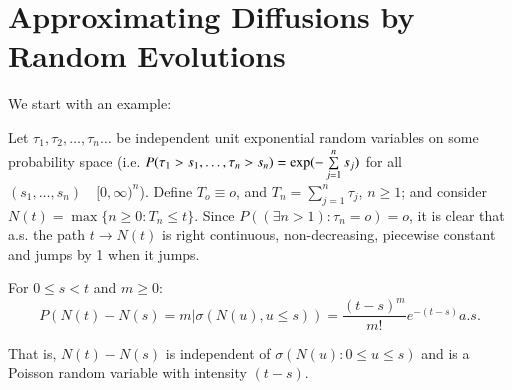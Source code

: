 \section{Approximating Diffusions by Random Evolutions}

We start with an example:


Let $\tau_1, \tau_2 , \ldots , \tau_n \ldots$ be independent unit
exponential random variables on some probability space (i.e. $P(\tau_1
> s_1, \ldots , \tau_n > s_n) = \exp\break (- \sum \limits^{n}_{j=1}s_j)$ for
all $(s_1, \ldots ,s_n) \quad [0, \infty)^n$). Define $T_o \equiv o$,
  and $T_n = \sum \limits^{n}_{j=1}\tau_j$, $n \geq 1$; and consider
  $N(t)= \max \{n \geq 0 : T_n \leq t\}$. Since $P((\exists n > 1):
  \tau_n = o)=o$, it is clear that a.s. the path $t \to N(t)$ is
  right continuous, non-decreasing, piecewise constant and jumps by
  1 when it jumps. 

\setcounter{lemma}{0}
\begin{lemma}\label{chap2:lem2.1}%
For $0 \leq s < t $ and $m \geq 0$:
\begin{equation*}
P(N(t)-N(s)= m | \sigma (N(u),u \leq s ))= \frac{(t-s)^m}{m
  !}e^{-(t-s)} a.s.\tag{2.2}\label{chap2:eq2.2}  
\end{equation*}

 That is, $N(t)- N(s)$ is independent of $\sigma(N(u): 0 \leq u \leq
 s)$ and is a Poisson random variable with intensity $(t-s)$.  
\end{lemma}

